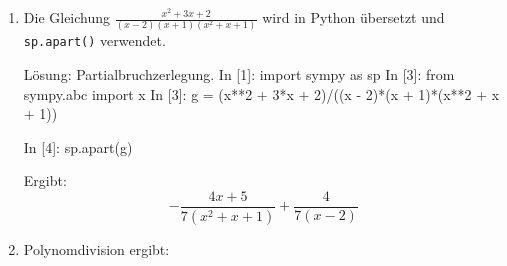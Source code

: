 \begin{enumerate}
\item Die Gleichung $ \frac{x^{2} + 3 x + 2}{\left(x - 2\right) \left(x + 1\right) \left(x^{2} + x + 1\right)}$ wird in Python übersetzt und \texttt{sp.apart()} verwendet.
\begin{python}{Lösung: Partialbruchzerlegung.}
In [1]: import sympy as sp
In [3]: from sympy.abc import x
In [3]: g = (x**2 + 3*x + 2)/((x - 2)*(x + 1)*(x**2 + x + 1))

In [4]: sp.apart(g)
\end{python}

Ergibt:
$$- \frac{4 x + 5}{7 \left(x^{2} + x + 1\right)} + \frac{4}{7 \left(x - 2\right)}$$

\item Polynomdivision ergibt: 


\end{enumerate}

